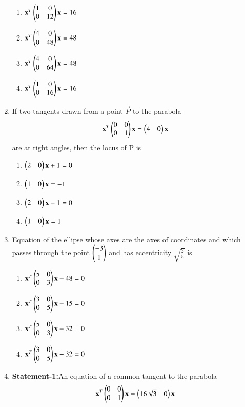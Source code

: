 \begin{enumerate}[label=\arabic*.,ref=\thesubsection.\theenumi]
    \begin{enumerate}
    \item $\mathbf{x}^T\begin{pmatrix}1&0\\0&12\end{pmatrix}\mathbf{x}=16$
    \item $\mathbf{x}^T\begin{pmatrix}4&0\\0&48\end{pmatrix}\mathbf{x}=48$ 
    \item $\mathbf{x}^T\begin{pmatrix}4&0\\0&64\end{pmatrix}\mathbf{x}=48$
    \item $\mathbf{x}^T\begin{pmatrix}1&0\\0&16\end{pmatrix}\mathbf{x}=16$ 
    \end{enumerate}
    \item If two tangents drawn from a point $\vec{P}$ to the parabola
    \begin{align}
    \mathbf{x}^T\begin{pmatrix}0&0\\0&1\end{pmatrix}\mathbf{x}=\begin{pmatrix}4&0\end{pmatrix}\mathbf{x}
    \end{align} are at right angles, then the locus of P is
    \begin{enumerate}
    \item $\begin{pmatrix}2&0\end{pmatrix}\mathbf{x}+1=0$
    \item $\begin{pmatrix}1&0\end{pmatrix}\mathbf{x}=-1$ 
    \item $\begin{pmatrix}2&0\end{pmatrix}\mathbf{x}-1=0$
    \item $\begin{pmatrix}1&0\end{pmatrix}\mathbf{x}=1$
    \end{enumerate}
    \item Equation of the ellipse whose axes are the axes of coordinates and which passes through the point $\begin{pmatrix}-3\\1\end{pmatrix}$ and has eccentricity $\sqrt{\frac{2}{5}}$ is
    \begin{enumerate}
    \item $\mathbf{x}^T\begin{pmatrix}5&0\\0&3\end{pmatrix}\mathbf{x}-48=0$
    \item $\mathbf{x}^T\begin{pmatrix}3&0\\0&5\end{pmatrix}\mathbf{x}-15=0$ 
    \item $\mathbf{x}^T\begin{pmatrix}5&0\\0&3\end{pmatrix}\mathbf{x}-32=0$
    \item $\mathbf{x}^T\begin{pmatrix}3&0\\0&5\end{pmatrix}\mathbf{x}-32=0$ 
    \end{enumerate}
    \item \textbf{Statement-1:}An equation of a common tangent to the parabola
    \begin{align}
    \vec{x}^T\myvec{0&0\\0&1}\vec{x}=\myvec{16\sqrt{3}&0}\vec{x} 

\end{align}
\end{enumerate}
